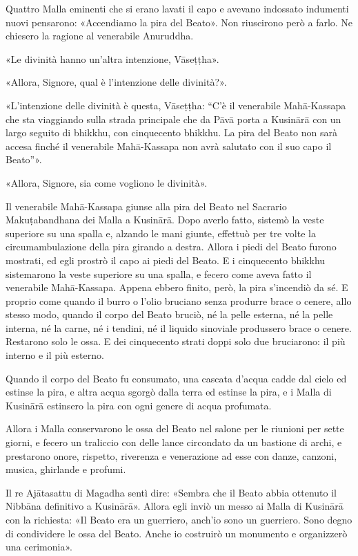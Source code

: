 
Quattro Malla eminenti che si erano lavati il capo e avevano indossato indumenti
nuovi pensarono: «Accendiamo la pira del Beato». Non riuscirono però a farlo. Ne
chiesero la ragione al venerabile Anuruddha.

«Le divinità hanno un’altra intenzione, Vāseṭṭha».

«Allora, Signore, qual è l’intenzione delle divinità?».

«L’intenzione delle divinità è questa, Vāseṭṭha: “C’è il venerabile Mahā-Kassapa
che sta viaggiando sulla strada principale che da Pāvā porta a Kusinārā con un
largo seguito di bhikkhu, con cinquecento bhikkhu. La pira del Beato non sarà
accesa finché il venerabile Mahā-Kassapa non avrà salutato con il suo capo il
Beato”».

«Allora, Signore, sia come vogliono le divinità».

Il venerabile Mahā-Kassapa giunse alla pira del Beato nel Sacrario
Makuṭabandhana dei Malla a Kusinārā. Dopo averlo fatto, sistemò la veste
superiore su una spalla e, alzando le mani giunte, effettuò per tre volte la
circumambulazione della pira girando a destra. Allora i piedi del Beato furono
mostrati, ed egli prostrò il capo ai piedi del Beato. E i cinquecento bhikkhu
sistemarono la veste superiore su una spalla, e fecero come aveva fatto il
venerabile Mahā-Kassapa. Appena ebbero finito, però, la pira s’incendiò da sé. E
proprio come quando il burro o l’olio bruciano senza produrre brace o cenere,
allo stesso modo, quando il corpo del Beato bruciò, né la pelle esterna, né la
pelle interna, né la carne, né i tendini, né il liquido sinoviale produssero
brace o cenere. Restarono solo le ossa. E dei cinquecento strati doppi solo due
bruciarono: il più interno e il più esterno.

Quando il corpo del Beato fu consumato, una cascata d’acqua cadde dal cielo ed
estinse la pira, e altra acqua sgorgò dalla terra ed estinse la pira, e i Malla
di Kusinārā estinsero la pira con ogni genere di acqua profumata.

Allora i Malla conservarono le ossa del Beato nel salone per le riunioni per
sette giorni, e fecero un traliccio con delle lance circondato da un bastione di
archi, e prestarono onore, rispetto, riverenza e venerazione ad esse con danze,
canzoni, musica, ghirlande e profumi.

Il re Ajātasattu di Magadha sentì dire: «Sembra che il Beato abbia ottenuto il
Nibbāna definitivo a Kusinārā». Allora egli inviò un messo ai Malla di Kusinārā
con la richiesta: «Il Beato era un guerriero, anch’io sono un guerriero. Sono
degno di condividere le ossa del Beato. Anche io costruirò un monumento e
organizzerò una cerimonia».

